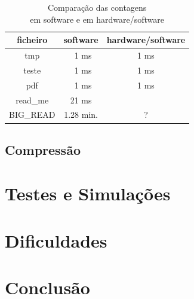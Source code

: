 \documentclass[a4paper]{article}
\begin{document}
	\begin{table}
		\centering
		\caption{Comparação das contagens \\em software e em hardware/software}

		\begin{tabular}{|c|c|c|}
			\hline
			ficheiro   & software   & hardware/software \\ \hline \hline
			tmp        & \ 1 ms     & 1 ms         \\ \hline
			teste      & \ 1 ms     & 1 ms         \\ \hline
			pdf        & \ 1 ms     & 1 ms         \\ \hline
			read\_me   & 21 ms      &           \\ \hline
			BIG\_READ  & 1.28 min.  & ?         \\
			\hline
		\end{tabular}
		\label{tab:time_hardware}
	\end{table}


	\subsection{Compressão}

	\section{Testes e Simulações}

	\section{Dificuldades}

	\section{Conclusão}

  \listoffigures
  \listoftables

\end{document}
